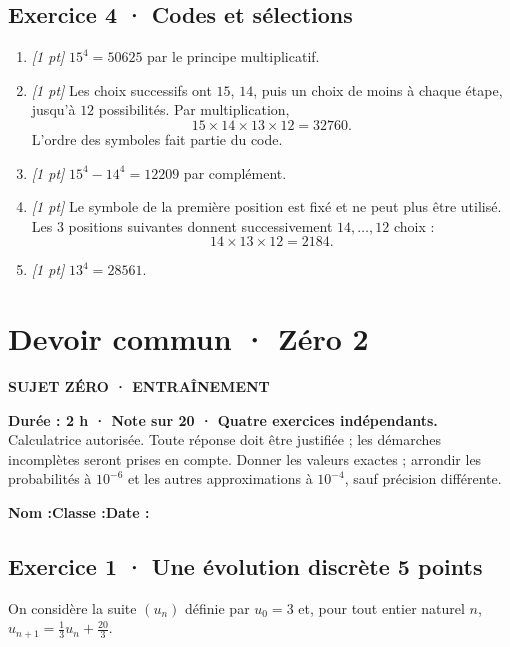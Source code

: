 \subsection*{Exercice 4 · Codes et sélections}\begin{enumerate}

\item \textit{[1 pt]} $15^4=50625$ par le principe multiplicatif.

\item \textit{[1 pt]} Les choix successifs ont $15$, $14$, puis un choix de moins à chaque étape, jusqu'à $12$ possibilités. Par multiplication,
\[15\times14\times13\times12=32760.\]
L'ordre des symboles fait partie du code.

\item \textit{[1 pt]} $15^4-14^4=12209$ par complément.

\item \textit{[1 pt]} Le symbole de la première position est fixé et ne peut plus être utilisé. Les $3$ positions suivantes donnent successivement $14,\ldots,12$ choix :
\[14\times13\times12=2184.\]

\item \textit{[1 pt]} $13^4=28561$.

\end{enumerate}

\fi

\clearpage{}\label{sujet:3-2}

\section*{Devoir commun · Zéro 2}

{\sffamily\bfseries\color{teal}SUJET ZÉRO · ENTRAÎNEMENT\par}

\textbf{Durée : 2 h · Note sur 20 · Quatre exercices indépendants.}\\Calculatrice autorisée. Toute réponse doit être justifiée ; les démarches incomplètes seront prises en compte. Donner les valeurs exactes ; arrondir les probabilités à $10^{-6}$ et les autres approximations à $10^{-4}$, sauf précision différente.

\smallskip\textbf{Nom :}\enspace\dotfill\quad\textbf{Classe :}\enspace\dotfill\quad\textbf{Date :}\enspace\dotfill

\subsection*{Exercice 1 · Une évolution discrète \hfill 5 points}On considère la suite $(u_n)$ définie par $u_0=3$ et, pour tout entier naturel $n$, $u_{n+1}=\frac{1}{3}u_n+\frac{20}{3}$.

